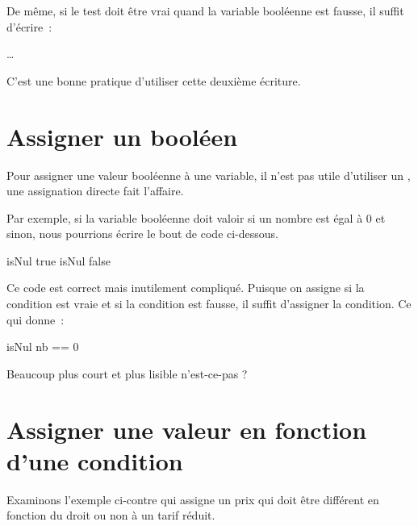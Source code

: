 	De même, si le test doit être vrai quand la variable booléenne est fausse,
	il suffit d’écrire~: 
	
	\begin{pseudocode}
			\Stmt \dots
		\EndIf
	\end{pseudocode}

	C'est une bonne pratique d'utiliser cette deuxième écriture. 


\section{Assigner un booléen}\label{B-ass-bool}

	Pour assigner une valeur booléenne à une variable, il n'est pas utile
	d'utiliser un , une assignation directe fait l'affaire. 

	Par exemple, si la variable booléenne  doit valoir  si un
	nombre est égal à 0 et  sinon, nous pourrions écrire le bout de
	code ci-dessous.	

	\begin{wrong}
	\begin{pseudocode}
		\If{nb == 0}
			\Let isNul \Gets true
		\Else
			\Let isNul \Gets false
		\EndIf
	\end{pseudocode}
	\end{wrong}


	Ce code est correct mais inutilement compliqué.  Puisque on assigne
	 si la condition est vraie et  si la condition est
	fausse, il suffit d’assigner la condition.  Ce qui donne~:

	\begin{pseudocode}
		\Let isNul \Gets nb == 0
	\end{pseudocode}

	Beaucoup plus court et plus lisible n'est-ce-pas ? 


\section{Assigner une valeur en fonction d’une condition}\label{B-ass-val}

	Examinons l’exemple ci-contre qui assigne un prix  qui doit être
	différent en fonction du droit ou non à un tarif réduit.  
	
